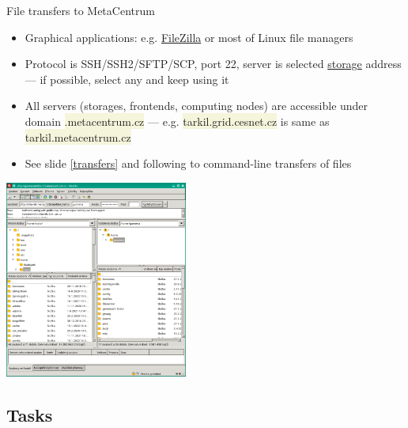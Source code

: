 \documentclass[compress, xelatex, 11pt, xcolor=svgnames, aspectratio=169,
	hyperref={
		bookmarks=true,
		unicode=true,
		colorlinks=true,
		pdftitle={Linux, command line and MetaCentrum},
		plainpages=false,
		pdfauthor={Vojtech Zeisek},
		pdfsubject={Course about use of Linux command line, writing shell scripts and using MetaCentrum of CESNET},
		pdfcreator={XeLaTeX},
		pdfkeywords={Linux, GNU, BASH, shell, command line, MetaCentrum},
		linkcolor=DarkRed, %
		anchorcolor=DarkBlue, %
		citecolor=Indigo, %
		filecolor=NavyBlue, %
		menucolor=DarkMagenta, %
		urlcolor=DarkBlue, %
		},
	url={hyphens, lowtilde} %
	]{beamer}
\renewcommand{\texttt}[1]{\colorbox{Beige}{{\ttfamily #1}}}
\begin{document}
\begin{frame}{File transfers to MetaCentrum}
	\begin{multicols}{2}
		\begin{itemize}
			\item Graphical applications: e.g. \href{https://filezilla-project.org/}{FileZilla} or most of Linux file managers
			\item Protocol is SSH/SSH2/SFTP/SCP, port 22, server is selected \href{https://docs.metacentrum.cz/snippets/storages-direct-ssh-table/}{storage} address --- if possible, select any and keep using it
			\item All servers (storages, frontends, computing nodes) are accessible under domain \texttt{*.metacentrum.cz} --- e.g. \texttt{tarkil.grid.cesnet.cz} is same as \texttt{tarkil.metacentrum.cz}
			\item See slide \ref{transfers} and following to command-line transfers of files
		\end{itemize}
		\begin{center}
			\includegraphics[height=6.5cm]{filezilla.png}
		\end{center}
	\end{multicols}
\end{frame}

\subsection{Tasks}
\end{document}
